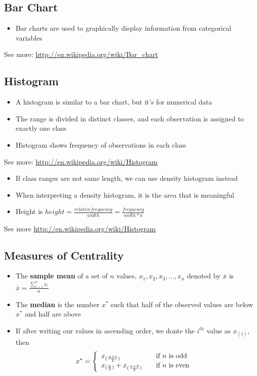 \documentclass[12pt]{report}
\begin{document}
    \subsection{Bar Chart}
      \begin{itemize}
        \item Bar charts are used to graphically display information from
          categorical variables
      \end{itemize}
      See more: \url{http://en.wikipedia.org/wiki/Bar_chart}

    \subsection{Histogram}
      \begin{itemize}
        \item A histogram is similar to a bar chart, but it's for numerical
          data
        \item The range is divided in distinct classes, and each observation is
          assigned to exactly one class
        \item Histogram shows frequency of observations in each class
      \end{itemize}
     See more: \url{http://en.wikipedia.org/wiki/Histogram}

      \begin{itemize}
        \item If class ranges are not same length, we can use density histogram
          instead
        \item When interpreting a density histogram, it is the area that is
          meaningful
        \item Height is $ height = \frac{relative frequency}{width} =
          \frac{frequency}{width * n} $
      \end{itemize}
      See more \url{http://en.wikipedia.org/wiki/Histogram}
    \subsection{Measures of Centrality}
      \begin{itemize}
        \item The \textbf{sample mean} of a set of $n$ values, $x_1, x_2,
          x_3,\ldots, x_n$ denoted by $\bar{x}$ is $\bar{x} =
          \frac{\sum_{i=1}^{n} x_i}{n}$
        \item The \textbf{median} is the number $x^*$ such that half of the
          observed values are below $x^*$ and half are above
        \item If after writing our values in ascending order, we donte the
          $i^{th}$ value as $x_{(i)}$, then\\
          \[
              x^* = \left\{
              \begin{array}{l l}
                x_{(\frac{n+1}{2})} & \quad \text{if $n$ is odd}\\
                x_{(\frac{n}{2})}+x_{(\frac{n+2}{2})}& \quad \text{if $n$ is
              even}
              \end{array} \right.
          \]
      \end{itemize}
\end{document}
